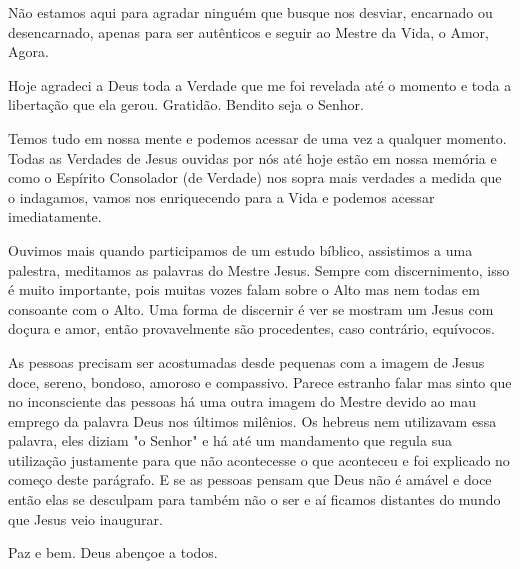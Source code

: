\emdash{}Não estamos aqui para agradar ninguém que busque nos desviar, encarnado ou desencarnado, apenas para ser autênticos e seguir ao Mestre da Vida, o Amor, Agora.

\emdash{}Hoje agradeci a Deus toda a Verdade que me foi revelada até o momento e toda a libertação que ela gerou. Gratidão. Bendito seja o Senhor.

\emdash{}Temos tudo em nossa mente e podemos acessar de uma vez a qualquer momento. Todas as Verdades de Jesus ouvidas por nós até hoje estão em nossa memória e como o Espírito Consolador (de Verdade) nos sopra mais verdades a medida que o indagamos, vamos nos enriquecendo para a Vida e podemos acessar imediatamente.

\emdash{}Ouvimos mais quando participamos de um estudo bíblico, assistimos a uma palestra, meditamos as palavras do Mestre Jesus. Sempre com discernimento, isso é muito importante, pois muitas vozes falam sobre o Alto mas nem todas em consoante com o Alto.
Uma forma de discernir é ver se mostram um Jesus com doçura e amor, então provavelmente são procedentes, caso contrário, equívocos.

\emdash{}As pessoas precisam ser acostumadas desde pequenas com a imagem de Jesus doce, sereno, bondoso, amoroso e compassivo. Parece estranho falar mas sinto que no inconsciente das pessoas há uma outra imagem do Mestre devido ao mau emprego da palavra Deus nos últimos milênios. Os hebreus nem utilizavam essa palavra, eles diziam "o Senhor" e há até um mandamento que regula sua utilização justamente para que não acontecesse o que aconteceu e foi explicado no começo deste parágrafo. E se as pessoas pensam que Deus não é amável e doce então elas se desculpam para também não o ser e aí ficamos distantes do mundo que Jesus veio inaugurar.

\emdash{}Paz e bem. Deus abençoe a todos.